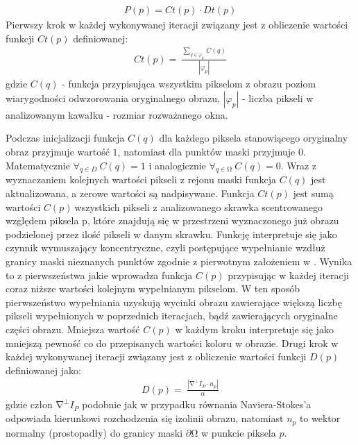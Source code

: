 \documentclass[12pt, twoside, openany]{report}
\theoremstyle{definition}
\begin{document}
\begin{align}
P\left(p\right)=Ct(p)\cdot Dt(p)
\label{PRIORITY}
\end{align}
Pierwszy krok w każdej wykonywanej iteracji związany jest z obliczenie wartości funkcji $Ct(p)$ definiowanej:
\begin{align}
Ct\left(p\right)=\ \frac{\sum_{q\in {\varphi }_{p'}}{C(q)}}{\left|{\varphi }_p\right|}
\label{confidenceTerm}
\end{align}
gdzie $C(q)$ - funkcja przypisująca wszystkim pikselom z obrazu poziom wiarygodności odwzorowania oryginalnego obrazu, $\left|{\varphi }_p\right|$ - liczba pikseli w analizowanym kawałku - rozmiar rozważanego okna. 
\par
Podczas inicjalizacji funkcja $C(q)$ dla każdego piksela stanowiącego oryginalny obraz przyjmuje wartość $1$, natomiast dla punktów maski przyjmuje 0. Matematycznie ${\forall }_{q\in D}\ C\left(q\right)=1$  i analogicznie ${\forall }_{q\in \mathrm{\Omega }}\ C\left(q\right)=0$. Wraz z wyznaczaniem kolejnych wartości pikseli z rejonu maski funkcja $C\left(q\right)$ jest aktualizowana, a zerowe wartości są nadpisywane. Funkcja $Ct\left(p\right)$ jest sumą wartości $C\left(p\right)\ $wszystkich pikseli z analizowanego skrawka scentrowanego względem piksela p, które znajdują się w przestrzeni wyznaczonego już obrazu podzielonej przez ilość pikseli w danym skrawku. Funkcję interpretuje się jako czynnik wymuszający koncentryczne, czyli postępujące wypełnianie wzdłuż granicy maski nieznanych punktów zgodnie z pierwotnym założeniem w \cite{efros1999texture}. Wynika to z pierwszeństwa jakie wprowadza funkcja $C\left(p\right)$ przypisując w każdej iteracji coraz niższe wartości kolejnym wypełnianym pikselom. W ten sposób pierwszeństwo wypełniania uzyskują wycinki obrazu zawierające większą liczbę pikseli wypełnionych w poprzednich iteracjach, bądź zawierających oryginalne części obrazu. Mniejsza wartość $C\left(p\right)$ w każdym kroku interpretuje się jako mniejszą pewność co do przepisanych wartości koloru w obrazie. Drugi krok w każdej wykonywanej iteracji związany jest z obliczenie wartości funkcji $D(p)$ definiowanej jako:
\begin{align}
D(p)=\ \frac{\left|{\mathrm{\nabla }}^{\bot }I_P\cdot n_p\right|}{\alpha }
\label{DataTerm}
\end{align}
gdzie człon ${\mathrm{\nabla }}^{\bot }I_P$ podobnie jak w przypadku równania Naviera-Stokes'a odpowiada kierunkowi rozchodzenia się izolinii obrazu, natomiast  $n_p$ to wektor normalny (prostopadły) do granicy maski $\partial \mathrm{\Omega }$ w punkcie piksela $p$.  
\end{document}
